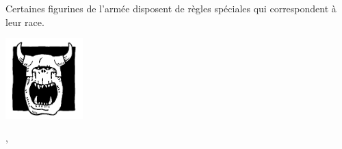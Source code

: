 

\startarmyspecialrules

\armyspecialruleentry{\greenhideraces}

Certaines figurines de l'armée disposent de règles spéciales qui correspondent à leur race.

\newcommand{\logosize}{3cm}
\begin{multicols}{3}\raggedcolumns

\begin{center}
\includegraphics[width=\logosize]{pics/commonorc.png}
\vspace*{-1cm}\subsubtitle{\commonorc}

\unruly{}, \borntofight{}
\end{center}

\columnbreak


\end{multicols}
